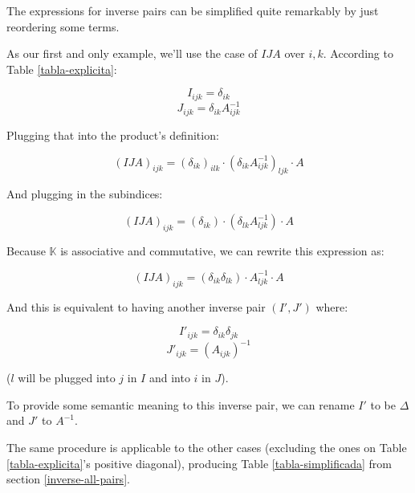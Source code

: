 The expressions for inverse pairs can be simplified quite remarkably by just reordering some terms.

As our first and only example, we'll use the case of $IJA$ over $i, k$. According to Table \ref{tabla-explicita}:

$$I_{ijk} = \delta_{ik}$$
$$J_{ijk} = \delta_{ik} A_{ijk}^{-1}$$

Plugging that into the product's definition:

$$(IJA)_{ijk} = (\delta_{ik})_{ilk} \cdot (\delta_{ik} A_{ijk}^{-1})_{ljk} \cdot A$$

And plugging in the subindices:

$$(IJA)_{ijk} = (\delta_{ik}) \cdot (\delta_{lk} A_{ljk}^{-1}) \cdot A$$

Because $\mathbb{K}$ is associative and commutative, we can rewrite this expression as:

$$(IJA)_{ijk} = (\delta_{ik} \delta_{lk}) \cdot A_{ljk}^{-1} \cdot A$$

And this is equivalent to having another inverse pair $(I', J')$ where:

$$I'_{ijk} = \delta_{ik} \delta_{jk}$$
$$J'_{ijk} = (A_{ijk})^{-1}$$

($l$ will be plugged into $j$ in $I$ and into $i$ in $J$).

To provide some semantic meaning to this inverse pair, we can rename $I'$ to be $\Delta$ and $J'$ to $A^{-1}$.

The same procedure is applicable to the other cases (excluding the ones on Table \ref{tabla-explicita}'s positive diagonal), producing Table \ref{tabla-simplificada} from section \ref{inverse-all-pairs}.
